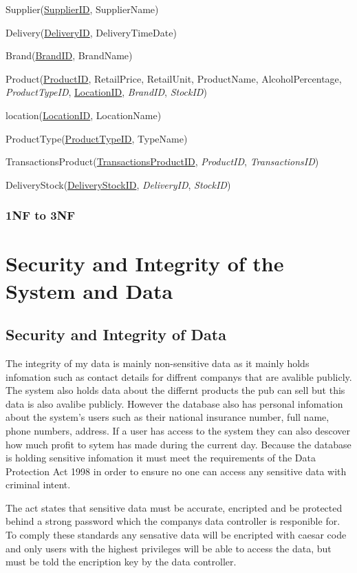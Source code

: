 Supplier(\underline{SupplierID}, SupplierName)

Delivery(\underline{DeliveryID}, DeliveryTimeDate)

Brand(\underline{BrandID}, BrandName)

Product(\underline{ProductID}, RetailPrice, RetailUnit, ProductName, AlcoholPercentage, \emph{ProductTypeID}, \underline{LocationID}, \emph{BrandID}, \emph{StockID})

location(\underline{LocationID}, LocationName)

ProductType(\underline{ProductTypeID}, TypeName)

TransactionsProduct(\underline{TransactionsProductID}, \emph{ProductID}, \emph{TransactionsID})

DeliveryStock(\underline{DeliveryStockID}, \emph{DeliveryID}, \emph{StockID})

\subsubsection{1NF to 3NF}

\section{Security and Integrity of the System and Data}

\subsection{Security and Integrity of Data}

The integrity of my data is mainly non-sensitive data as it mainly holds infomation such as contact details for diffrent companys that are avalible publicly. The system also holds data about the differnt products the pub can sell but this data is also avalibe publicly. However the database also has personal infomation about the system's users such as their national insurance number, full name, phone numbers, address. If a user has access to the system they can also descover how much profit to sytem has made during the current day. Because the database is holding sensitive infomation it must meet the requirements of the Data Protection Act 1998 in order to ensure no one can access any sensitive data with criminal intent. 

The act states that sensitive data must be accurate, encripted and be protected behind a strong password which the companys data controller is responible for. To comply these standards any sensative data will be encripted with caesar code  and only users with the highest privileges will be able to access the data, but must be told the encription key by the data controller.

